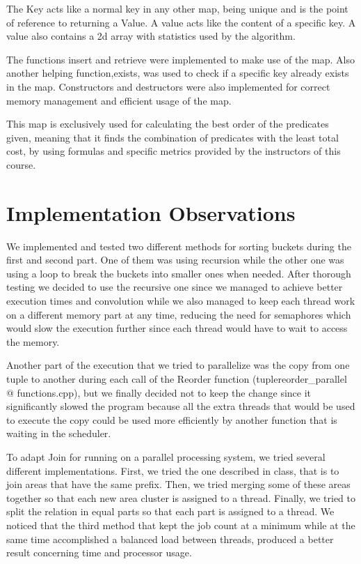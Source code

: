 \documentclass{ws-ijprai}
\begin{document}
\tab The Key acts like a normal key in any other map, being unique and is the point of reference to returning a Value. A value acts like the content of a specific key. A value also contains a 2d array with statistics used by the algorithm.

\tab The functions insert and retrieve were implemented to make use of the map. Also another helping function,exists, was used to check if a specific key already exists in the map. Constructors and destructors were also implemented for correct memory management and efficient usage of the map.

\tab This map is exclusively used for calculating the best order of the predicates given, meaning that it finds the combination of predicates with the least total cost, by using formulas and specific metrics provided by the instructors of this course.


\section{Implementation Observations}

\tab We implemented and tested two different methods for sorting buckets during the first and second part. One of them was using recursion while the other one was using a loop to break the buckets into smaller ones when needed. After thorough testing we decided to use the recursive one since we managed to achieve better execution times and convolution while we also managed to keep each thread work on a different memory part at any time, reducing the need for semaphores which would slow the execution further since each thread would have to wait to access the memory.

\tab Another part of the execution that we tried to parallelize was the copy from one tuple to another during each call of the Reorder function (tuplereorder\_parallel @ functions.cpp), but we finally decided not to keep the change since it significantly slowed the program because all the extra threads that would be used to execute the copy could be used more efficiently by another function that is waiting in the scheduler.

\tab To adapt Join for running on a parallel processing system, we tried several different implementations. First, we tried the one described in class, that is to join areas that have the same prefix. Then, we tried merging some of these areas together so that each new area cluster is assigned to a thread. Finally, we tried to split the relation in equal parts so that each part is assigned to a thread. We noticed that the third method that kept the job count at a minimum while at the same time accomplished a balanced load between threads, produced a better result concerning time and processor usage.
\end{document}
